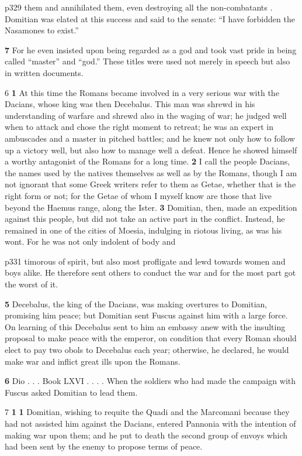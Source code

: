 p329 them and annihilated them, even destroying all the non-combatants . Domitian was elated at this success and said to the senate: ``I have forbidden the Nasamones to exist.''

\textbf{7} For he even insisted upon being regarded as a god and took vast pride in being called ``master'' and ``god.'' These titles were used not merely in speech but also in written documents.

6 \textbf{1} At this time the Romans became involved in a very serious war with the Dacians, whose king was then Decebalus. This man was shrewd in his understanding of warfare and shrewd also in the waging of war; he judged well when to attack and chose the right moment to retreat; he was an expert in ambuscades and a master in pitched battles; and he knew not only how to follow up a victory well, but also how to manage well a defeat. Hence he showed himself a worthy antagonist of the Romans for a long time. \textbf{2} I call the people Dacians, the names used by the natives themselves as well as by the Romans, though I am not ignorant that some Greek writers refer to them as Getae, whether that is the right form or not; for the Getae of whom I myself know are those that live beyond the Haemus range, along the Ister. \textbf{3} Domitian, then, made an expedition against this people, but did not take an active part in the conflict. Instead, he remained in one of the cities of Moesia, indulging in riotous living, as was his wont. For he was not only indolent of body and

p331 timorous of spirit, but also most profligate and lewd towards women and boys alike. He therefore sent others to conduct the war and for the most part got the worst of it.

\textbf{5} Decebalus, the king of the Dacians, was making overtures to Domitian, promising him peace; but Domitian sent Fuscus against him with a large force. On learning of this Decebalus sent to him an embassy anew with the insulting proposal to make peace with the emperor, on condition that every Roman should elect to pay two obols to Decebalus each year; otherwise, he declared, he would make war and inflict great ills upon the Romans.

\textbf{6} Dio . . . Book LXVI . . . . When the soldiers who had made the campaign with Fuscus asked Domitian to lead them.

7 \textbf{1} \textbf{1} Domitian, wishing to requite the Quadi and the Marcomani because they had not assisted him against the Dacians, entered Pannonia with the intention of making war upon them; and he put to death the second group of envoys which had been sent by the enemy to propose terms of peace.

